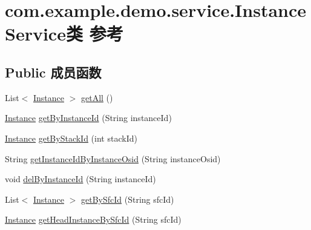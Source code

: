 \hypertarget{classcom_1_1example_1_1demo_1_1service_1_1_instance_service}{}\section{com.\+example.\+demo.\+service.\+Instance\+Service类 参考}
\label{classcom_1_1example_1_1demo_1_1service_1_1_instance_service}
\subsection*{Public 成员函数}
\begin{DoxyCompactItemize}
\item 
List$<$ \mbox{\hyperlink{classcom_1_1example_1_1demo_1_1modular_1_1_instance}{Instance}} $>$ \mbox{\hyperlink{classcom_1_1example_1_1demo_1_1service_1_1_instance_service_a958fd2317a90949502a7c23efd1d02d2}{get\+All}} ()
\item 
\mbox{\hyperlink{classcom_1_1example_1_1demo_1_1modular_1_1_instance}{Instance}} \mbox{\hyperlink{classcom_1_1example_1_1demo_1_1service_1_1_instance_service_af7915685f1607d72d715e2cd9677132d}{get\+By\+Instance\+Id}} (String instance\+Id)
\item 
\mbox{\hyperlink{classcom_1_1example_1_1demo_1_1modular_1_1_instance}{Instance}} \mbox{\hyperlink{classcom_1_1example_1_1demo_1_1service_1_1_instance_service_ac2e423d4fefb99d6a95153695be160f0}{get\+By\+Stack\+Id}} (int stack\+Id)
\item 
String \mbox{\hyperlink{classcom_1_1example_1_1demo_1_1service_1_1_instance_service_a6bccc9abbf82d3bbdf35df311d202cc4}{get\+Instance\+Id\+By\+Instance\+Osid}} (String instance\+Osid)
\item 
void \mbox{\hyperlink{classcom_1_1example_1_1demo_1_1service_1_1_instance_service_a1cfe7a3871f2bd61c6aecae228b32c1b}{del\+By\+Instance\+Id}} (String instance\+Id)
\item 
List$<$ \mbox{\hyperlink{classcom_1_1example_1_1demo_1_1modular_1_1_instance}{Instance}} $>$ \mbox{\hyperlink{classcom_1_1example_1_1demo_1_1service_1_1_instance_service_a83ee70c0f1ae8294f3f057a56d6463e4}{get\+By\+Sfc\+Id}} (String sfc\+Id)
\item 
\mbox{\hyperlink{classcom_1_1example_1_1demo_1_1modular_1_1_instance}{Instance}} \mbox{\hyperlink{classcom_1_1example_1_1demo_1_1service_1_1_instance_service_a6670bfbdb057f7415f82a9c60a767aea}{get\+Head\+Instance\+By\+Sfc\+Id}} (String sfc\+Id)
\item 

\end{DoxyCompactItemize}
